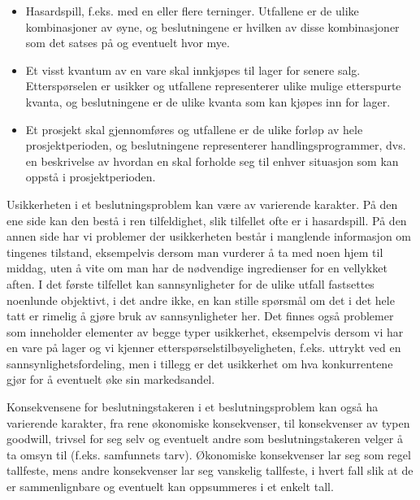 \begin{itemize}
\item  Hasardspill, f.eks. med en eller flere terninger.  Utfallene er
       de ulike kombinasjoner av øyne, og beslutningene er hvilken
       av disse kombinasjoner som det satses på og eventuelt hvor mye.
\item  Et visst kvantum av en vare skal innkjøpes til lager for
       senere salg.  Etterspørselen er usikker og utfallene 
       representerer ulike mulige etterspurte kvanta, og beslutningene
       er de ulike kvanta som kan kjøpes inn for lager.
\item  Et prosjekt skal gjennomføres og utfallene er de ulike forløp
       av hele prosjektperioden, og beslutningene representerer
       handlingsprogrammer, dvs. en beskrivelse av hvordan en skal
       forholde seg til enhver situasjon som kan oppstå i 
       prosjektperioden.
\end{itemize}
Usikkerheten i et beslutningsproblem kan være av varierende karakter.
På den ene side kan den bestå i ren tilfeldighet, slik tilfellet
ofte er i hasardspill.  På den annen side har vi problemer der
usikkerheten består i manglende informasjon om tingenes tilstand,
eksempelvis dersom man vurderer å ta med noen hjem til middag, uten
å vite om man har de nødvendige ingredienser for en vellykket
aften.  I det første tilfellet kan sannsynligheter for de ulike 
utfall fastsettes noenlunde objektivt, i det andre ikke, en kan stille
spørsmål om det i det hele tatt er rimelig å gjøre bruk av
sannsynligheter her.  Det finnes også problemer som inneholder
elementer av begge typer usikkerhet, eksempelvis dersom vi har en vare
på lager og vi kjenner etterspørselstilbøyeligheten, f.eks.
uttrykt ved en sannsynlighetsfordeling, men i tillegg er det usikkerhet
om hva konkurrentene gjør for å eventuelt øke sin markedsandel.

Konsekvensene for beslutningstakeren i et beslutningsproblem kan også
ha varierende karakter, fra rene økonomiske konsekvenser, til
konsekvenser av typen goodwill, trivsel for seg selv og eventuelt andre som
beslut\-nings\-takeren velger å ta omsyn til (f.eks. samfunnets tarv).
Økonomiske konsekvenser lar seg som regel tallfeste, mens andre 
konsekvenser lar seg vanskelig tallfeste, i hvert fall slik at de er
sammenlignbare og eventuelt kan oppsummeres i et enkelt tall.\\

